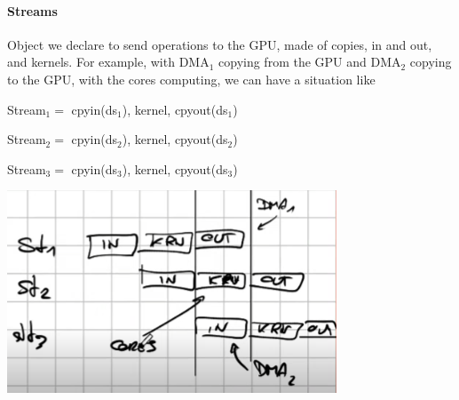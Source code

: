 \documentclass[10pt]{report}
\begin{document}
\paragraph{Streams} Object we declare to send operations to the GPU, made of copies, in and out, and kernels. For example, with DMA$_1$ copying from the GPU and DMA$_2$ copying to the GPU, with the cores computing, we can have a situation like
\begin{multicols}{2}
\begin{list}{}{}
	\item Stream$_1 = $ cpyin(ds$_1$), kernel, cpyout(ds$_1$)
	\item Stream$_2 = $ cpyin(ds$_2$), kernel, cpyout(ds$_2$)
	\item Stream$_3 = $ cpyin(ds$_3$), kernel, cpyout(ds$_3$)
\end{list}
\begin{center}
	\includegraphics[scale=0.5]{24.png}
\end{center}
\end{multicols}
\pagebreak
\end{document}
